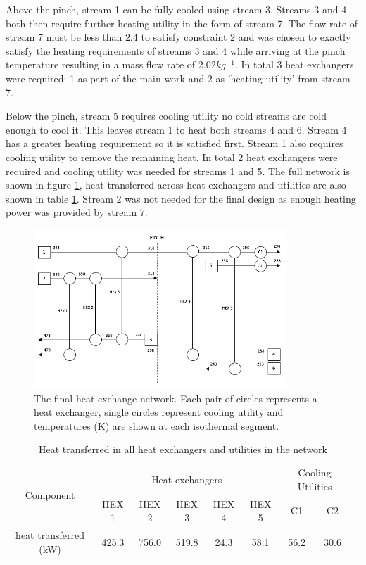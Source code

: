 Above the pinch, stream 1 can be fully cooled using stream 3. Streams 3 and 4 both then require further heating utility in the form of stream 7. The flow rate of stream 7 must be less than $2.4$ to satisfy constraint 2 and was chosen to exactly satisfy the heating requirements of streams 3 and 4 while arriving at the pinch temperature resulting in a mass flow rate of $2.02 kg^{-1}$. In total 3 heat exchangers were required: 1 as part of the main work and 2 as 'heating utility' from stream 7. 

Below the pinch, stream 5 requires cooling utility no cold streams are cold enough to cool it. This leaves stream 1 to heat both streams 4 and 6. Stream 4 has a greater heating requirement so it is satisfied first. Stream 1 also requires cooling utility to remove the remaining heat. In total 2 heat exchangers were required and cooling utility was needed for streams 1 and 5. The full network is shown in figure \ref{fig:heatexnetwork}, heat transferred across heat exchangers and utilities are also shown in table \ref{tab:powerhex}. Stream 2 was not needed for the final design as enough heating power was provided by stream 7. 

\begin{figure} [h]
\centering
\includegraphics[width=0.85\textwidth]{./pictures/heatexnetwork.png}
  \caption{The final heat exchange network. Each pair of circles represents a heat exchanger, single circles represent cooling utility and temperatures (K) are shown at each isothermal segment.} \label{fig:heatexnetwork}
  \end{figure}

\begin {table} [h]
\begin{center}
\caption{Heat transferred in all heat exchangers and utilities in the network} \label{tab:powerhex} 
\begin{tabular}{ |c|c|c|c|c|c|c|c|c| }
 \hline
\multirow{2}{*}{Component} & \multicolumn{5}{|c|}{Heat exchangers }& \multicolumn{2}{|c|}{Cooling Utilities}\\ 
 \cline{2-8}
   & HEX 1 & HEX 2 & HEX 3 & HEX 4 &HEX 5 & C1 & C2\\ 
 \hline
 heat transferred (kW) & 425.3 & 756.0 & 519.8 & 24.3 & 58.1 & 56.2 & 30.6\\ 
 \hline
\end{tabular}
\end{center}  
\end {table}

